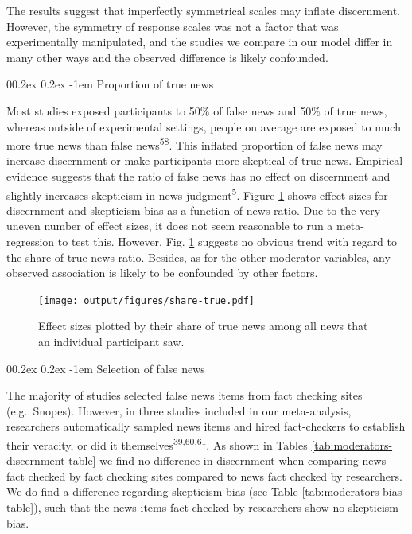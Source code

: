\documentclass[
  doc,floatsintext]{apa6}
\makeatletter
\let\oldparagraph\paragraph
\renewcommand{\paragraph}[1]{\oldparagraph{#1}\mbox{}}
\renewcommand{\paragraph}{\@startsection{paragraph}{4}{\parindent}%
  {0\baselineskip \@plus 0.2ex \@minus 0.2ex}%
  {-1em}%
  {\normalfont\normalsize\bfseries\itshape\typesectitle}}
\makeatother
\begin{document}
The results suggest that imperfectly symmetrical scales may inflate discernment. However, the symmetry of response scales was not a factor that was experimentally manipulated, and the studies we compare in our model differ in many other ways and the observed difference is likely confounded.

\paragraph{Proportion of true news}\label{proportion-of-true-news}

Most studies exposed participants to 50\% of false news and 50\% of true news, whereas outside of experimental settings, people on average are exposed to much more true news than false news\textsuperscript{58}. This inflated proportion of false news may increase discernment or make participants more skeptical of true news. Empirical evidence suggests that the ratio of false news has no effect on discernment and slightly increases skepticism in news judgment\textsuperscript{5}. Figure \ref{fig:share-true} shows effect sizes for discernment and skepticism bias as a function of news ratio. Due to the very uneven number of effect sizes, it does not seem reasonable to run a meta-regression to test this. However, Fig. \ref{fig:share-true} suggests no obvious trend with regard to the share of true news ratio. Besides, as for the other moderator variables, any observed association is likely to be confounded by other factors.



\begin{figure}
\centering
\texttt{[image: output/figures/share-true.pdf]}
\caption{\label{fig:share-true}Effect sizes plotted by their share of true news among all news that an individual participant saw.}
\end{figure}

\paragraph{Selection of false news}\label{selection-of-false-news}

The majority of studies selected false news items from fact checking sites (e.g.~Snopes). However, in three studies included in our meta-analysis, researchers automatically sampled news items and hired fact-checkers to establish their veracity, or did it themselves\textsuperscript{39,60,61}. As shown in Tables \ref{tab:moderators-discernment-table} we find no difference in discernment when comparing news fact checked by fact checking sites compared to news fact checked by researchers. We do find a difference regarding skepticism bias (see Table \ref{tab:moderators-bias-table}), such that the news items fact checked by researchers show no skepticism bias.
\end{document}
